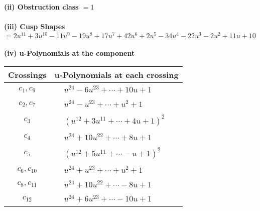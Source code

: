 \documentclass[1p]{elsarticle_modified}
\theoremstyle{definition}
\begin{document}
\flushleft \textbf{(ii) Obstruction class $= 1$}\\~\\
\flushleft \textbf{(iii) Cusp Shapes $= 2 u^{11}+3 u^{10}-11 u^9-19 u^8+17 u^7+42 u^6+2 u^5-34 u^4-22 u^3-2 u^2+11 u+10$}\\~\\
\newpage\renewcommand{\arraystretch}{1}
\flushleft \textbf{(iv) u-Polynomials at the component}\newline \\
\begin{tabular}{m{50pt}|m{274pt}}
Crossings & \hspace{64pt}u-Polynomials at each crossing \\
\hline $$\begin{aligned}c_{1},c_{9}\end{aligned}$$&$\begin{aligned}
&u^{24}-6 u^{23}+\cdots+10 u+1
\end{aligned}$\\
\hline $$\begin{aligned}c_{2},c_{7}\end{aligned}$$&$\begin{aligned}
&u^{24}- u^{23}+\cdots+u^2+1
\end{aligned}$\\
\hline $$\begin{aligned}c_{3}\end{aligned}$$&$\begin{aligned}
&(u^{12}+3 u^{11}+\cdots+4 u+1)^{2}
\end{aligned}$\\
\hline $$\begin{aligned}c_{4}\end{aligned}$$&$\begin{aligned}
&u^{24}+10 u^{22}+\cdots+8 u+1
\end{aligned}$\\
\hline $$\begin{aligned}c_{5}\end{aligned}$$&$\begin{aligned}
&(u^{12}+5 u^{11}+\cdots- u+1)^{2}
\end{aligned}$\\
\hline $$\begin{aligned}c_{6},c_{10}\end{aligned}$$&$\begin{aligned}
&u^{24}+u^{23}+\cdots+u^2+1
\end{aligned}$\\
\hline $$\begin{aligned}c_{8},c_{11}\end{aligned}$$&$\begin{aligned}
&u^{24}+10 u^{22}+\cdots-8 u+1
\end{aligned}$\\
\hline $$\begin{aligned}c_{12}\end{aligned}$$&$\begin{aligned}
&u^{24}+6 u^{23}+\cdots-10 u+1
\end{aligned}$\\
\hline
\end{tabular}\\~\\
\end{document}
